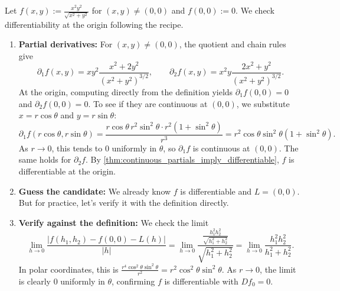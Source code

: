 \begin{example}
\label{ex:differentiability_recipe_positive}
Let $f(x,y) := \frac{x^2 y^2}{\sqrt{x^2+y^2}}$ for $(x,y) \neq (0,0)$ and $f(0,0) := 0$. We check differentiability at the origin following the recipe.
\begin{enumerate}[label=\textbf{(\alph*)}]
  \item \textbf{Partial derivatives:} For $(x,y) \neq (0,0)$, the quotient and chain rules give
    \[\partial_1 f(x,y) = xy^2\frac{x^2+2y^2}{(x^2+y^2)^{3/2}}, \qquad \partial_2 f(x,y) = x^2y\frac{2x^2+y^2}{(x^2+y^2)^{3/2}}.\]
    At the origin, computing directly from the definition yields $\partial_1 f(0,0) = 0$ and $\partial_2 f(0,0) = 0$.
    To see if they are continuous at $(0,0)$, we substitute $x = r\cos\theta$ and $y = r\sin\theta$:
    \[\partial_1 f(r\cos\theta, r\sin\theta) = \frac{r\cos\theta\,r^2\sin^2\theta \cdot r^2(1+\sin^2\theta)}{r^3} = r^2\cos\theta\sin^2\theta(1+\sin^2\theta).\]
    As $r \to 0$, this tends to $0$ uniformly in $\theta$, so $\partial_1 f$ is continuous at $(0,0)$. The same holds for $\partial_2 f$. By \cref{thm:continuous_partials_imply_differentiable}, $f$ is differentiable at the origin.
  \item \textbf{Guess the candidate:} We already know $f$ is differentiable and $L = (0,0)$. But for practice, let's verify it with the definition directly.
  \item \textbf{Verify against the definition:} We check the limit
    \[\lim_{h\to 0} \frac{|f(h_1,h_2) - f(0,0) - L(h)|}{|h|} = \lim_{h\to 0} \frac{\frac{h_1^2 h_2^2}{\sqrt{h_1^2+h_2^2}}}{\sqrt{h_1^2+h_2^2}} = \lim_{h\to 0} \frac{h_1^2 h_2^2}{h_1^2+h_2^2}.\]
    In polar coordinates, this is $\frac{r^4\cos^2\theta\sin^2\theta}{r^2} = r^2\cos^2\theta\sin^2\theta$. As $r \to 0$, the limit is clearly $0$ uniformly in $\theta$, confirming $f$ is differentiable with $Df_0 = 0$.
\end{enumerate}
\end{example}

